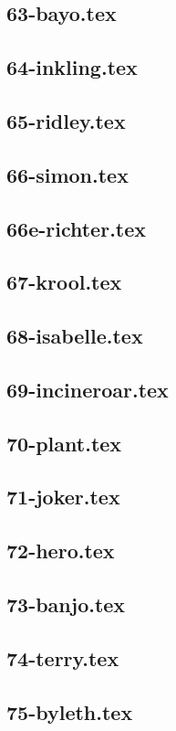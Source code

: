 \subsection{63-bayo.tex}
\subsection{64-inkling.tex}
\subsection{65-ridley.tex}
\subsection{66-simon.tex}
\subsection{66e-richter.tex}
\subsection{67-krool.tex}
\subsection{68-isabelle.tex}
\subsection{69-incineroar.tex}
\subsection{70-plant.tex}
\subsection{71-joker.tex}
\subsection{72-hero.tex}
\subsection{73-banjo.tex}
\subsection{74-terry.tex}
\subsection{75-byleth.tex}
